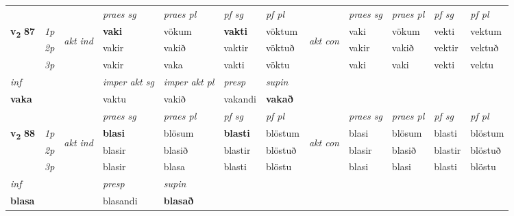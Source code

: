 \begin{longtable}[l]{X>{\footnotesize\itshape}llXXXXlXXXX}
\midrule

 & &   & \textit{praes sg}  & \textit{praes pl}    & \textit{ pf sg} & \textit{pf pl} & & \textit{praes sg}  & \textit{praes pl}    & \textit{pf sg} & \textit{pf pl }  \\ \cmidrule{4-7} \cmidrule{9-12}
 \multirow{2}{*}{{{\textbf{v{\textsubscript{2}}} \Large{\textbf{87}}}}}  & 1p & \multirow{3}{*}{\begin{turn}{90}\textit{akt ind}\end{turn}} & \textbf{vaki} & vökum & \textbf{vakti} & vöktum & \multirow{3}{*}{\begin{turn}{90}\textit{akt con}\end{turn}} &vaki & vökum & vekti & vektum\\*
 & 2p &  &  vakir  & vakið & vaktir & vöktuð & & vakir & vakið & vektir & vektuð \\*
 & 3p &  & vakir & vaka & vakti & vöktu & & vaki & vaki& vekti & vektu \\*
\cmidrule{4-7} \cmidrule{9-12}

   {\textit{inf}} & &  & \textit{imper akt sg} & \textit{imper akt pl}   & \textit{presp} & \textit{supin}   \\*
  {\textbf{vaka}} & && vaktu  & vakið   & vakandi &  \textbf{vakað}   \\*

\midrule

 & &   & \textit{praes sg}  & \textit{praes pl}    & \textit{ pf sg} & \textit{pf pl} & & \textit{praes sg}  & \textit{praes pl}    & \textit{pf sg} & \textit{pf pl }  \\ \cmidrule{4-7} \cmidrule{9-12}
 \multirow{2}{*}{{{\textbf{v{\textsubscript{2}}} \Large{\textbf{88}}}}}  & 1p & \multirow{3}{*}{\begin{turn}{90}\textit{akt ind}\end{turn}} & \textbf{blasi} & blösum & \textbf{blasti} & blöstum & \multirow{3}{*}{\begin{turn}{90}\textit{akt con}\end{turn}} &blasi & blösum & blasti & blöstum\\*
 & 2p &  &  blasir  & blasið & blastir & blöstuð & & blasir & blasið & blastir & blöstuð \\*
 & 3p &  & blasir & blasa & blasti & blöstu & & blasi & blasi& blasti & blöstu \\*
\cmidrule{4-7} \cmidrule{9-12}

   {\textit{inf}} & &     & \textit{presp} & \textit{supin}   \\*
  {\textbf{blasa}} & &     & blasandi &  \textbf{blasað}   \\*


\end{longtable}
